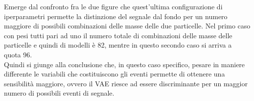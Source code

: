 Emerge dal confronto fra le due figure che quest'ultima configurazione di iperparametri permette la distinzione del segnale dal fondo per un numero maggiore di possibili combinazioni delle masse delle due particelle. Nel primo caso con pesi tutti pari ad uno il numero totale di combinazioni delle masse delle particelle e quindi di modelli è 82, mentre in questo secondo caso si arriva a quota 96. \\
Quindi si giunge alla conclusione che, in questo caso specifico, pesare in maniere differente le variabili che costituiscono gli eventi permette di ottenere una sensibilità maggiore, ovvero il VAE riesce ad essere discriminante per un maggior numero di possibili eventi di segnale.

